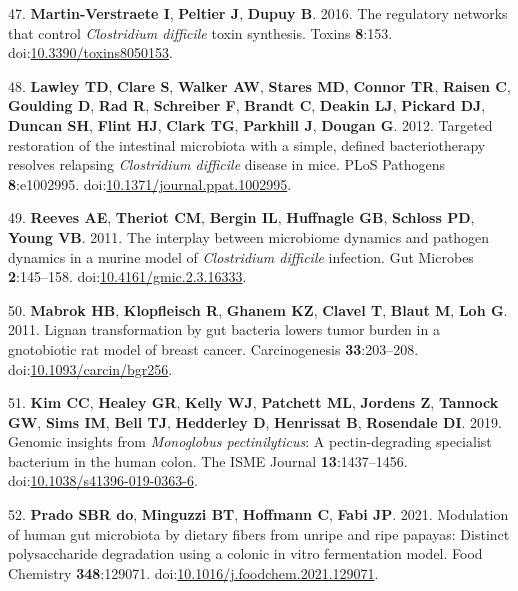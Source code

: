 \documentclass[
  12pt,
]{article}
\newenvironment{cslreferences}%
  {}%
  {\par}
\begin{document}
\begin{cslreferences}
\leavevmode\hypertarget{ref-MartinVerstraete2016}{}%
47. \textbf{Martin-Verstraete I}, \textbf{Peltier J}, \textbf{Dupuy B}.
2016. The regulatory networks that control \emph{Clostridium difficile}
toxin synthesis. Toxins \textbf{8}:153.
doi:\href{https://doi.org/10.3390/toxins8050153}{10.3390/toxins8050153}.

\leavevmode\hypertarget{ref-Lawley2012}{}%
48. \textbf{Lawley TD}, \textbf{Clare S}, \textbf{Walker AW},
\textbf{Stares MD}, \textbf{Connor TR}, \textbf{Raisen C},
\textbf{Goulding D}, \textbf{Rad R}, \textbf{Schreiber F},
\textbf{Brandt C}, \textbf{Deakin LJ}, \textbf{Pickard DJ},
\textbf{Duncan SH}, \textbf{Flint HJ}, \textbf{Clark TG},
\textbf{Parkhill J}, \textbf{Dougan G}. 2012. Targeted restoration of
the intestinal microbiota with a simple, defined bacteriotherapy
resolves relapsing \emph{Clostridium difficile} disease in mice. PLoS
Pathogens \textbf{8}:e1002995.
doi:\href{https://doi.org/10.1371/journal.ppat.1002995}{10.1371/journal.ppat.1002995}.

\leavevmode\hypertarget{ref-Reeves2011}{}%
49. \textbf{Reeves AE}, \textbf{Theriot CM}, \textbf{Bergin IL},
\textbf{Huffnagle GB}, \textbf{Schloss PD}, \textbf{Young VB}. 2011. The
interplay between microbiome dynamics and pathogen dynamics in a murine
model of \emph{Clostridium difficile} infection. Gut Microbes
\textbf{2}:145--158.
doi:\href{https://doi.org/10.4161/gmic.2.3.16333}{10.4161/gmic.2.3.16333}.

\leavevmode\hypertarget{ref-Mabrok2011}{}%
50. \textbf{Mabrok HB}, \textbf{Klopfleisch R}, \textbf{Ghanem KZ},
\textbf{Clavel T}, \textbf{Blaut M}, \textbf{Loh G}. 2011. Lignan
transformation by gut bacteria lowers tumor burden in a gnotobiotic rat
model of breast cancer. Carcinogenesis \textbf{33}:203--208.
doi:\href{https://doi.org/10.1093/carcin/bgr256}{10.1093/carcin/bgr256}.

\leavevmode\hypertarget{ref-Kim2019}{}%
51. \textbf{Kim CC}, \textbf{Healey GR}, \textbf{Kelly WJ},
\textbf{Patchett ML}, \textbf{Jordens Z}, \textbf{Tannock GW},
\textbf{Sims IM}, \textbf{Bell TJ}, \textbf{Hedderley D},
\textbf{Henrissat B}, \textbf{Rosendale DI}. 2019. Genomic insights from
\emph{Monoglobus pectinilyticus}: A pectin-degrading specialist
bacterium in the human colon. The ISME Journal \textbf{13}:1437--1456.
doi:\href{https://doi.org/10.1038/s41396-019-0363-6}{10.1038/s41396-019-0363-6}.

\leavevmode\hypertarget{ref-doPrado2021}{}%
52. \textbf{Prado SBR do}, \textbf{Minguzzi BT}, \textbf{Hoffmann C},
\textbf{Fabi JP}. 2021. Modulation of human gut microbiota by dietary
fibers from unripe and ripe papayas: Distinct polysaccharide degradation
using a colonic in vitro fermentation model. Food Chemistry
\textbf{348}:129071.
doi:\href{https://doi.org/10.1016/j.foodchem.2021.129071}{10.1016/j.foodchem.2021.129071}.


\end{cslreferences}
\end{document}
